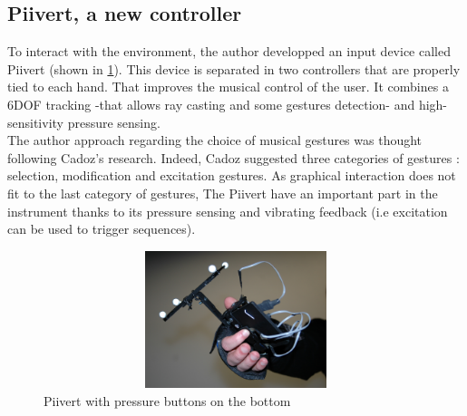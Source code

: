 \subsection{Piivert, a new controller}

To interact with the environment, the author developped an input device called Piivert \cite{berthaut2010piivert}(shown in \ref{fig:piivert}). This device is separated in two controllers that are properly tied to each hand. That improves the musical control of the user. It combines a 6DOF tracking -that allows ray casting and some gestures detection- and high-sensitivity pressure sensing.\\
The author approach regarding the choice of musical gestures was thought following Cadoz's \cite{cadoz1999musique} research. Indeed, Cadoz suggested three categories of gestures : selection, modification and excitation gestures. As graphical interaction does not fit to the last category of gestures, The Piivert have an important part in the instrument thanks to its pressure sensing and vibrating feedback (i.e excitation can be used to trigger sequences).

\begin{figure}[h!]
\centering\includegraphics[width=14cm,height=4cm]{image/piivert.jpg}
\caption{Piivert with pressure buttons on the bottom}
\label{fig:piivert}
\end{figure} 